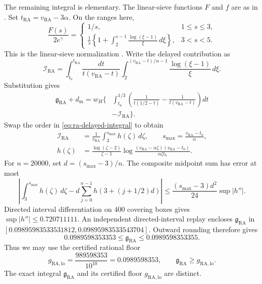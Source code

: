 The remaining integral is elementary.
The linear-sieve functions $F$ and $f$ are as in
\cite[(1.8)--(1.9), pp.~172--173]{Iwaniec1980Rosser}.
Set \(t_{\mathrm{RA}}=v_{\mathrm{RA}}-3\alpha\). On the ranges here,
\begin{equation}\label{eq:ra-delay-formula}
 \frac{F(s)}{2e^\gamma}
  =\begin{cases}
      1/s,&1\le s\le3,\\[2pt]
      \displaystyle\frac1s\left\{1+
            \int_2^{s-1}\frac{\log(\xi-1)}\xi\,d\xi\right\},&3<s<5.
    \end{cases}
\end{equation}
This is the linear-sieve normalization
\cite[p.~202]{Iwaniec1980Rosser}\cite[(2.23)]{PaperI}.
Write the delayed contribution as
\begin{equation}\label{eq:ra-delayed-integral}
 \mathcal I_{\mathrm{RA}}=
 \int_{t_0}^{t_{\mathrm{RA}}}\frac{dt}{t(v_{\mathrm{RA}}-t)}
 \int_2^{(v_{\mathrm{RA}}-t)/\alpha-1}
                 \frac{\log(\xi-1)}\xi\,d\xi.
\end{equation}
Substitution gives
\begin{equation}\label{eq:ra-gain-elementary}
\begin{aligned}
 \mathfrak g_{\mathrm{RA}}+d_{\mathrm m}
 =w_H\Bigg\{&\int_{t_0}^{1/3}
   \left(\frac1{t(1/2-t)}-\frac1{t(v_{\mathrm{RA}}-t)}\right)dt\\
 &-\mathcal I_{\mathrm{RA}}\Bigg\}.
\end{aligned}
\end{equation}
Swap the order in \eqref{eq:ra-delayed-integral} to obtain
\begin{equation}\label{eq:ra-swapped-integral}
\begin{aligned}
 \mathcal I_{\mathrm{RA}}&=\frac1{v_{\mathrm{RA}}}
 \int_3^{s_{\max}}h(\zeta)\,d\zeta,\qquad
 s_{\max}=\frac{v_{\mathrm{RA}}-t_0}{\alpha},\\
 h(\zeta)&=\frac{\log(\zeta-2)}{\zeta-1}
 \log\frac{(v_{\mathrm{RA}}-\alpha\zeta)(v_{\mathrm{RA}}-t_0)}
               {\alpha\zeta t_0}.
\end{aligned}
\end{equation}
For \(n=20000\), set \(d=(s_{\max}-3)/n\). The composite midpoint sum
has error at most
\[
 \left|\int_3^{s_{\max}}h(\zeta)\,d\zeta
      -d\sum_{j=0}^{n-1}h(3+(j+1/2)d)\right|
 \le\frac{(s_{\max}-3)d^2}{24}\sup|h''|.
\]
Directed interval differentiation on \(400\) covering boxes gives
\(\sup|h''|\le0.720711111\). An independent directed-interval replay
encloses
\(\mathfrak g_{\mathrm{RA}}\) in
\([0.09895983533531812,0.09895983533543704]\).
Outward rounding therefore gives
\begin{equation}\label{eq:ra-gain-enclosure}
 0.0989598353353\le\mathfrak g_{\mathrm{RA}}
                      \le0.0989598353355.
\end{equation}
Thus we may use the certified rational floor
\begin{equation}\label{eq:ra-rational-floor}
 g_{\mathrm{RA,lo}}=\frac{989598353}{10^{10}}=0.0989598353,
 \qquad \mathfrak g_{\mathrm{RA}}\ge g_{\mathrm{RA,lo}}.
\end{equation}
The exact integral \(\mathfrak g_{\mathrm{RA}}\) and its certified floor
\(g_{\mathrm{RA,lo}}\) are distinct.


